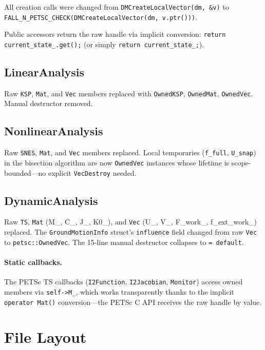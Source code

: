 All creation calls were changed from \texttt{DMCreateLocalVector(dm, \&v)}
to \texttt{FALL\_N\_PETSC\_CHECK(DMCreateLocalVector(dm, v.ptr()))}.

Public accessors return the raw handle via implicit conversion:
\texttt{return current\_state\_.get();} (or simply \texttt{return current\_state\_;}).

\subsection{LinearAnalysis}

Raw \texttt{KSP}, \texttt{Mat}, and \texttt{Vec} members replaced with
\texttt{OwnedKSP}, \texttt{OwnedMat}, \texttt{OwnedVec}.  Manual destructor
removed.

\subsection{NonlinearAnalysis}

Raw \texttt{SNES}, \texttt{Mat}, and \texttt{Vec} members replaced.
Local temporaries (\texttt{f\_full}, \texttt{U\_snap}) in the bisection
algorithm are now \texttt{OwnedVec} instances whose lifetime is
scope-bounded---no explicit \texttt{VecDestroy} needed.

\subsection{DynamicAnalysis}

Raw \texttt{TS}, \texttt{Mat} (M\_, C\_, J\_, K0\_), and \texttt{Vec}
(U\_, V\_, F\_work\_, f\_ext\_work\_) replaced.  The
\texttt{GroundMotionInfo} struct's \texttt{influence} field changed from
raw \texttt{Vec} to \texttt{petsc::OwnedVec}.  The 15-line manual
destructor collapses to \texttt{= default}.

\paragraph{Static callbacks.}  The PETSc TS callbacks
(\texttt{I2Function}, \texttt{I2Jacobian}, \texttt{Monitor}) access
owned members via \texttt{self->M\_}, which works transparently thanks to
the implicit \texttt{operator Mat()} conversion---the PETSc C API
receives the raw handle by value.

\section{File Layout}

